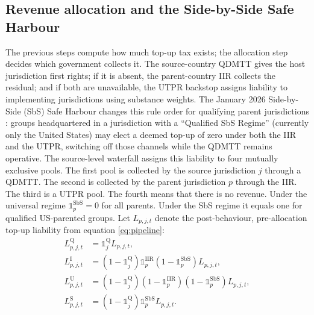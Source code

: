 \documentclass[11pt,a4paper]{article}
\begin{document}
\subsection{Revenue allocation and the Side-by-Side Safe Harbour}\label{sec:sbs}\label{sec:jan2026}

The previous steps compute how much top-up tax exists; the allocation step decides which government collects it. The source-country QDMTT gives the host jurisdiction first rights; if it is absent, the parent-country IIR collects the residual; and if both are unavailable, the UTPR backstop assigns liability to implementing jurisdictions using substance weights. The January 2026 Side-by-Side (SbS) Safe Harbour changes this rule order for qualifying parent jurisdictions \citep{oecd2026, oecdCentralRecord2026}: groups headquartered in a jurisdiction with a ``Qualified SbS Regime'' (currently only the United States) may elect a deemed top-up of zero under both the IIR and the UTPR, switching off those channels while the QDMTT remains operative. The source-level waterfall assigns this liability to four mutually exclusive pools. The first pool is collected by the source jurisdiction $j$ through a QDMTT. The second is collected by the parent jurisdiction $p$ through the IIR. The third is a UTPR pool. The fourth means that there is no revenue. Under the universal regime $\mathbb{1}_p^{\text{SbS}}=0$ for all parents. Under the SbS regime it equals one for qualified US-parented groups. Let $L_{p,j,t}$ denote the post-behaviour, pre-allocation top-up liability from equation \eqref{eq:pipeline}:
\begin{align}
L_{p,j,t}^{\text{Q}} &= \mathbb{1}_j^{\text{Q}} L_{p,j,t}, \label{eq:qdmtt_sbs} \\
L_{p,j,t}^{\text{I}} &= (1-\mathbb{1}_j^{\text{Q}})\mathbb{1}_p^{\text{IIR}}(1-\mathbb{1}_p^{\text{SbS}})L_{p,j,t}, \label{eq:iir_sbs} \\
L_{p,j,t}^{\text{U}} &= (1-\mathbb{1}_j^{\text{Q}})(1-\mathbb{1}_p^{\text{IIR}})(1-\mathbb{1}_p^{\text{SbS}})L_{p,j,t}, \label{eq:utpr_sbs} \\
L_{p,j,t}^{\text{S}} &= (1-\mathbb{1}_j^{\text{Q}})\mathbb{1}_p^{\text{SbS}}L_{p,j,t}. \label{eq:sbs_extinguish}
\end{align}
\end{document}
